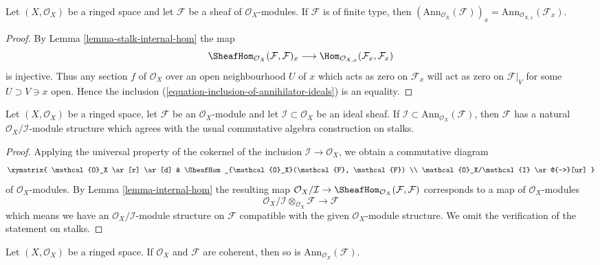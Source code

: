 \begin{lemma}
\label{lemma-finite-type-annihilator-stalk}
Let $(X, \mathcal{O}_X)$ be a ringed space and let
$\mathcal{F}$ be a sheaf of $\mathcal{O}_X$-modules.
If $\mathcal{F}$ is of finite type, then
$(\text{Ann}_{\mathcal{O}_X}(\mathcal{F}))_x =
\text{Ann}_{\mathcal{O}_{X, x}}(\mathcal{F}_x)$.
\end{lemma}

\begin{proof}
By Lemma \ref{lemma-stalk-internal-hom} the map
$$
\SheafHom_{\mathcal{O}_X}(\mathcal{F}, \mathcal{F})_x \longrightarrow
\Hom_{\mathcal{O}_{X,x}}(\mathcal{F}_x, \mathcal{F}_x)
$$
is injective. Thus any section $f$ of $\mathcal{O}_X$ over an open
neighbourhood $U$ of $x$ which acts as zero on $\mathcal{F}_x$
will act as zero on $\mathcal{F}|_V$ for some $U \supset V \ni x$ open.
Hence the inclusion (\ref{equation-inclusion-of-annihilator-ideals})
is an equality.
\end{proof}

\begin{lemma}
\label{lemma-induced-quotient-ring-sheaf-module-structure}
Let $(X, \mathcal{O}_X)$ be a ringed space, let $\mathcal{F}$ be an
$\mathcal{O}_X$-module and let $\mathcal{I} \subset \mathcal{O}_X$
be an ideal sheaf. If
$\mathcal{I} \subset \text{Ann}_{\mathcal{O}_X}(\mathcal{F})$,
then $\mathcal{F}$ has a natural $\mathcal{O}_X/\mathcal{I}$-module structure
which agrees with the usual commutative algebra construction on stalks.
\end{lemma}

\begin{proof}
Applying the universal property of the cokernel of the inclusion
$\mathcal{I} \to \mathcal{O}_X$, we obtain a commutative diagram
$$
\xymatrix{
\mathcal{O}_X \ar[r] \ar[d] &
\SheafHom_{\mathcal{O}_X}(\mathcal{F}, \mathcal{F}) \\
\mathcal{O}_X/\mathcal{I} \ar@{-->}[ur]
}
$$
of $\mathcal{O}_X$-modules. By Lemma \ref{lemma-internal-hom}
the resulting map $\mathcal{O}_X/\mathcal{I} \to
\SheafHom_{\mathcal{O}_X}(\mathcal{F}, \mathcal{F})$
corresponds to a map of $\mathcal{O}_X$-modules
$$
\mathcal{O}_X/\mathcal{I} \otimes_{\mathcal{O}_X} \mathcal{F}
\longrightarrow
\mathcal{F}
$$
which means we have an $\mathcal{O}_X/\mathcal{I}$-module structure
on $\mathcal{F}$ compatible with the given $\mathcal{O}_X$-module structure.
We omit the verification of the statement on stalks.
\end{proof}

\begin{lemma}
\label{lemma-coherent-annihilator}
Let $(X,\mathcal{O}_X)$ be a ringed space.
If $\mathcal{O}_X$ and $\mathcal{F}$ are coherent,
then so is $\text{Ann}_{\mathcal{O}_X}(\mathcal{F})$.
\end{lemma}

